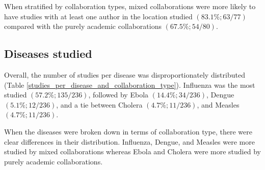 \documentclass[10pt,letterpaper]{article}
\begin{document}
When stratified by collaboration types, mixed collaborations were more likely to have studies with at least one author in the location studied $(83.1\%; 63/77)$ compared with the purely academic collaborations $(67.5\%; 54/80)$. 

\subsection*{Diseases studied}
Overall, the number of studies per disease was disproportionately distributed (Table \ref{studies_per_disease_and_collaboration_type}). Influenza was the most studied $(57.2\%; 135/236)$, followed by Ebola $(14.4\%; 34/236)$, Dengue $(5.1\%; 12/236)$, and a tie between Cholera $(4.7\%; 11/236)$, and Measles $(4.7\%; 11/236)$. 

When the diseases were broken down in terms of collaboration type, there were clear differences in their distribution. Influenza, Dengue, and Measles were more studied by mixed collaborations whereas Ebola and Cholera were more studied by purely academic collaborations. 
\end{document}

